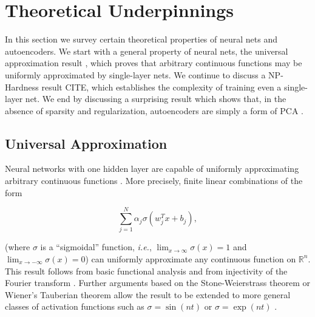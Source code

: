 \documentclass[twocolumn]{article}
\newcommand{\R}{\mathbb{R}}
\begin{document}


\section{Theoretical Underpinnings}
In this section we survey certain theoretical properties of neural nets and
autoencoders. We start with a general property of neural nets, the universal
approximation result \cite{cybenko1989approximation}, which proves that
arbitrary continuous functions may be uniformly approximated by single-layer
nets. We continue to discuss a NP-Hardness result CITE, which establishes the
complexity of training even a single-layer net. We end by discussing a
surprising result which shows that, in the absence of sparsity and
regularization, autoencoders are simply a form of PCA \cite{bourlard1988auto}.

\subsection{Universal Approximation}
Neural networks with one hidden layer are capable of uniformly approximating
arbitrary continuous functions \cite{cybenko1989approximation}. More precisely,
finite linear combinations of the form

\[\sum_{j=1}^N \alpha_j \sigma(w_j^T x + b_j), \]

(where $\sigma$ is a ``sigmoidal'' function, \textit{i.e.}, $\lim_{x \to \infty}
\sigma(x) = 1$ and $\lim_{x \to -\infty} \sigma(x) = 0$) can uniformly
approximate any continuous function on $\R^n$.
This result follows from basic functional analysis and from injectivity of the
Fourier transform \cite{rudin1991functional}. Further arguments based on the
Stone-Weierstrass theorem or Wiener's Tauberian theorem allow the result to be
extended to more general classes of activation functions such as $\sigma =
\sin(nt)$ or $\sigma = \exp(nt)$ \cite{rudin1991functional}.
\end{document}

